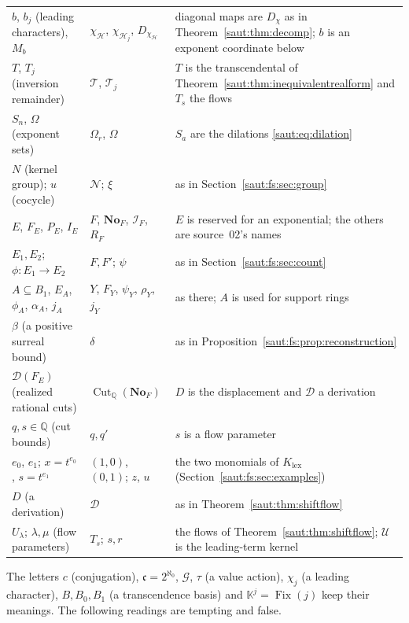 \documentclass[11pt]{article}
\theoremstyle{definition}
\theoremstyle{remark}
\newcommand{\No}{\mathbf{No}}
\newcommand{\Q}{\mathbb Q}
\newcommand{\K}{\mathbb K}
\newcommand{\U}{\mathcal U}
\newcommand{\Fix}{\operatorname{Fix}}
\newcommand{\cc}{\mathfrak c}
\newcommand{\Ineg}{\mathcal I}
\numberwithin{equation}{section}
\begin{document}
\begin{center}
\begin{longtable}{@{}>{\RaggedRight\arraybackslash}p{}>{\RaggedRight\arraybackslash}p{}>{\RaggedRight\arraybackslash}p{}@{}}
$b$, $b_j$ (leading characters), $M_b$ & $\chi_{\mathcal H}$, $\chi_{\mathcal H_j}$, $D_{\chi_{\mathcal H}}$ & diagonal maps are $D_\chi$ as in Theorem~\ref{saut:thm:decomp}; $b$ is an exponent coordinate below\\
$T$, $T_j$ (inversion remainder) & $\mathcal T$, $\mathcal T_j$ & $T$ is the transcendental of Theorem~\ref{saut:thm:inequivalentrealform} and $T_s$ the flows\\
$S_n$, $\Omega$ (exponent sets) & $\Omega_r$, $\Omega$ & $S_a$ are the dilations \eqref{saut:eq:dilation}\\
$N$ (kernel group); $u$ (cocycle) & $\mathcal N$; $\xi$ & as in Section~\ref{saut:fs:sec:group}\\
$E$, $F_E$, $P_E$, $I_E$ & $F$, $\No_F$, $\Ineg_F$, $R_F$ & $E$ is reserved for an exponential; the others are source~02's names\\
$E_1,E_2$; $\phi:E_1\to E_2$ & $F,F'$; $\psi$ & as in Section~\ref{saut:fs:sec:count}\\
$A\subseteq B_1$, $E_A$, $\phi_A$, $\alpha_A$, $j_A$ & $Y$, $F_Y$, $\psi_Y$, $\rho_Y$, $j_Y$ & as there; $A$ is used for support rings\\
$\beta$ (a positive surreal bound) & $\delta$ & as in Proposition~\ref{saut:fs:prop:reconstruction}\\
$\mathcal D(F_E)$ (realized rational cuts) & $\operatorname{Cut}_\Q(\No_F)$ & $D$ is the displacement and $\mathcal D$ a derivation\\
$q,s\in\Q$ (cut bounds) & $q,q'$ & $s$ is a flow parameter\\
$e_0$, $e_1$; $x=t^{e_0}$, $s=t^{e_1}$ & $(1,0)$, $(0,1)$; $z$, $u$ & the two monomials of $K_{\mathrm{lex}}$ (Section~\ref{saut:fs:sec:examples})\\
$D$ (a derivation) & $\mathcal D$ & as in Theorem~\ref{saut:thm:shiftflow}\\
$U_\lambda$; $\lambda,\mu$ (flow parameters) & $T_s$; $s,r$ & the flows of Theorem~\ref{saut:thm:shiftflow}; $\U$ is the leading-term kernel\\
\bottomrule
\end{longtable}
\end{center}
The letters $c$ (conjugation), $\cc=2^{\aleph_0}$, $\mathcal G$, $\tau$ (a value
action), $\chi_j$ (a leading character), $B,B_0,B_1$ (a transcendence basis) and
$\K^j=\Fix(j)$ keep their meanings. The following readings are tempting and false.
\end{document}
